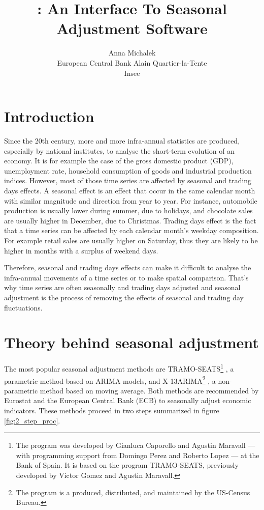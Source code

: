 \documentclass[article]{jss}
\author{
Anna Michalek\\European Central Bank \And Alain Quartier-la-Tente\\Insee
}
\title{\pkg{RJDemetra}: An \proglang{R} Interface To \proglang{JDemetra+}
Seasonal Adjustment Software}
\begin{document}
\hypertarget{introduction}{%
\section{Introduction}\label{introduction}}

Since the 20th century, more and more infra-annual statistics are
produced, especially by national institutes, to analyse the short-term
evolution of an economy. It is for example the case of the gross
domestic product (GDP), unemployment rate, household consumption of
goods and industrial production indices. However, most of those time
series are affected by seasonal and trading days effects. A seasonal
effect is an effect that occur in the same calendar month with similar
magnitude and direction from year to year. For instance, automobile
production is usually lower during summer, due to holidays, and
chocolate sales are usually higher in December, due to Christmas.
Trading days effect is the fact that a time series can be affected by
each calendar month's weekday composition. For example retail sales are
usually higher on Saturday, thus they are likely to be higher in months
with a surplus of weekend days.

Therefore, seasonal and trading days effects can make it difficult to
analyse the infra-annual movements of a time series or to make spatial
comparison. That's why time series are often seasonally and trading days
adjusted and seasonal adjustment is the process of removing the effects
of seasonal and trading day fluctuations.

\hypertarget{theory-behind-seasonal-adjustment}{%
\section{Theory behind seasonal
adjustment}\label{theory-behind-seasonal-adjustment}}

The most popular seasonal adjustment methods are TRAMO-SEATS\footnote{The
  program  was developed by Gianluca Caporello and
  Agustin Maravall --- with programming support from Domingo Perez and
  Roberto Lopez --- at the Bank of Spain. It is based on the program
  TRAMO-SEATS, previously developed by Victor Gomez and Agustin
  Maravall.} \citep{gomez1996programs, caporello2004program}, a
parametric method based on ARIMA models, and X-13ARIMA\footnote{The
  program  is a produced, distributed, and
  maintained by the US-Census Bureau.}
\citep{findleyx12, ladiray1999x11en}, a non-parametric method based on
moving average. Both methods are recommended by Eurostat and the
European Central Bank (ECB) to seasonally adjust economic indicators.
These methods proceed in two steps summarized in figure
\ref{fig:2_step_proc}.
\end{document}
